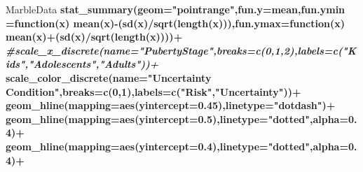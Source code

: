 \documentclass[]{article}
\newenvironment{Shaded}{\begin{snugshade}}{\end{snugshade}}
\newcommand{\KeywordTok}[1]{\textcolor[rgb]{0.13,0.29,0.53}{\textbf{#1}}}
\newcommand{\DataTypeTok}[1]{\textcolor[rgb]{0.13,0.29,0.53}{#1}}
\newcommand{\DecValTok}[1]{\textcolor[rgb]{0.00,0.00,0.81}{#1}}
\newcommand{\FloatTok}[1]{\textcolor[rgb]{0.00,0.00,0.81}{#1}}
\newcommand{\StringTok}[1]{\textcolor[rgb]{0.31,0.60,0.02}{#1}}
\newcommand{\CommentTok}[1]{\textcolor[rgb]{0.56,0.35,0.01}{\textit{#1}}}
\newcommand{\ControlFlowTok}[1]{\textcolor[rgb]{0.13,0.29,0.53}{\textbf{#1}}}
\newcommand{\OperatorTok}[1]{\textcolor[rgb]{0.81,0.36,0.00}{\textbf{#1}}}
\newcommand{\NormalTok}[1]{#1}
\begin{document}
\begin{Shaded}
\begin{Highlighting}[]
\NormalTok{MarbleData}\OperatorTok{%>%}\KeywordTok{filter}\NormalTok{(Social1Ind0}\OperatorTok{==}\DecValTok{0}\NormalTok{)}\OperatorTok{%>%}\KeywordTok{ggplot}\NormalTok{(}\KeywordTok{aes}\NormalTok{(}\DataTypeTok{y=}\NormalTok{ChooseRisk,}\DataTypeTok{x=}\NormalTok{probGamble,}\DataTypeTok{group=}\NormalTok{DFE1DFD0,}\DataTypeTok{shape=}\NormalTok{Social1Ind0,}\DataTypeTok{linetype=}\NormalTok{Social1Ind0))}\OperatorTok{+}\KeywordTok{stat_summary}\NormalTok{(}\DataTypeTok{mapping=}\KeywordTok{aes}\NormalTok{(}\DataTypeTok{color=}\NormalTok{DFE1DFD0,}\DataTypeTok{linetype=}\NormalTok{Social1Ind0),}\DataTypeTok{geom=}\StringTok{"line"}\NormalTok{,}\DataTypeTok{fun.y =}\NormalTok{ mean, }\DataTypeTok{size=}\DecValTok{3}\NormalTok{)}\OperatorTok{+}
\StringTok{ }\KeywordTok{stat_summary}\NormalTok{(}\DataTypeTok{geom=}\StringTok{"pointrange"}\NormalTok{,}\DataTypeTok{fun.y=}\NormalTok{mean,}\DataTypeTok{fun.ymin =}\ControlFlowTok{function}\NormalTok{(x) }\KeywordTok{mean}\NormalTok{(x)}\OperatorTok{-}\NormalTok{(}\KeywordTok{sd}\NormalTok{(x)}\OperatorTok{/}\KeywordTok{sqrt}\NormalTok{(}\KeywordTok{length}\NormalTok{(x))),}\DataTypeTok{fun.ymax=}\ControlFlowTok{function}\NormalTok{(x) }\KeywordTok{mean}\NormalTok{(x)}\OperatorTok{+}\NormalTok{(}\KeywordTok{sd}\NormalTok{(x)}\OperatorTok{/}\KeywordTok{sqrt}\NormalTok{(}\KeywordTok{length}\NormalTok{(x))))}\OperatorTok{+}
\StringTok{  }\CommentTok{#scale_x_discrete(name="PubertyStage",breaks=c(0,1,2),labels=c("Kids","Adolescents","Adults"))+}
\StringTok{  }\KeywordTok{scale_color_discrete}\NormalTok{(}\DataTypeTok{name=}\StringTok{"Uncertainty Condition"}\NormalTok{,}\DataTypeTok{breaks=}\KeywordTok{c}\NormalTok{(}\DecValTok{0}\NormalTok{,}\DecValTok{1}\NormalTok{),}\DataTypeTok{labels=}\KeywordTok{c}\NormalTok{(}\StringTok{"Risk"}\NormalTok{,}\StringTok{"Uncertainty"}\NormalTok{))}\OperatorTok{+}
\StringTok{  }\KeywordTok{geom_hline}\NormalTok{(}\DataTypeTok{mapping=}\KeywordTok{aes}\NormalTok{(}\DataTypeTok{yintercept=}\FloatTok{0.45}\NormalTok{),}\DataTypeTok{linetype=}\StringTok{"dotdash"}\NormalTok{)}\OperatorTok{+}
\StringTok{  }\KeywordTok{geom_hline}\NormalTok{(}\DataTypeTok{mapping=}\KeywordTok{aes}\NormalTok{(}\DataTypeTok{yintercept=}\FloatTok{0.5}\NormalTok{),}\DataTypeTok{linetype=}\StringTok{"dotted"}\NormalTok{,}\DataTypeTok{alpha=}\FloatTok{0.4}\NormalTok{)}\OperatorTok{+}
\StringTok{  }\KeywordTok{geom_hline}\NormalTok{(}\DataTypeTok{mapping=}\KeywordTok{aes}\NormalTok{(}\DataTypeTok{yintercept=}\FloatTok{0.4}\NormalTok{),}\DataTypeTok{linetype=}\StringTok{"dotted"}\NormalTok{,}\DataTypeTok{alpha=}\FloatTok{0.4}\NormalTok{)}\OperatorTok{+}
}
\end{Highlighting}
\end{Shaded}
\end{document}
